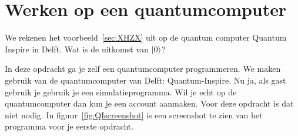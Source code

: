 \documentclass[../../main.tex]{subfiles}
\begin{document}
\onlyinsubfile{
\setcounter{chapter}{0}
}
\notinsubfile{}
\section{Werken op een quantumcomputer}\label{sec:wbQI}

We rekenen het voorbeeld~\ref{sec:XHZX} uit op de quantum computer Quantum Inspire in Delft. 
Wat is de uitkomst van $\ket{0}$?

In deze opdracht ga je zelf een quantumcomputer programmeren. We maken gebruik van de quantumcomputer van Delft: Quantum-Inspire. Nu ja, als gast gebruik je gebruik je een simulatieprogramma. Wil je echt op de quantumcomputer dan kun je een account aanmaken. Voor deze opdracht is dat niet nodig. 
In figuur~\ref{fig:QIscreenshot} is een screenshot te zien van het programma voor je eerste opdracht.
\end{document}
